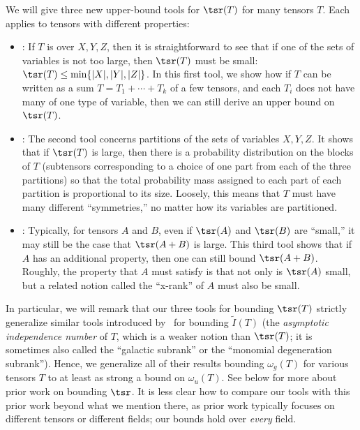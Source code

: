 \documentclass{toc}
\begin{document}
We will give three new 
%
upper-bound tools for  %
$\tsr(T)$ for many tensors $T$. Each applies to tensors with different properties:

\begin{itemize}
    \item {}: If $T$ is over $X,Y,Z$, then it is straightforward to see that if one of the 
    sets of variables
    is not too large, then $\tsr(T)$ must be small: $\tsr(T) \leq \min\{ |X|, |Y|, |Z| \}$. In this first tool, we show how if $T$ can be written as a sum $T = T_1 + \cdots + T_k$ of a few tensors, and each $T_i$ does not have many of one type of variable, then we can still derive an upper bound on $\tsr(T)$. 
    \item {}: The second tool concerns partitions of the  
    sets of variables
    $X,Y,Z$. It shows that if $\tsr(T)$ is large, then there is a probability distribution on the blocks of $T$ (subtensors corresponding to a choice of one part from each of the three partitions) so that the total probability mass assigned to each part of each partition is proportional to its size. Loosely, this means that $T$ must have many different ``symmetries,'' no matter how its variables are partitioned. 
    \item {}: Typically, for tensors $A$ and $B$, even if $\tsr(A)$ and $\tsr(B)$ are ``small,'' it may still be the case that $\tsr(A+B)$ is large. This third tool shows that if $A$ has an additional property, then one can still bound $\tsr(A+B)$. Roughly, the property that $A$ must satisfy is that not only is $\tsr(A)$ small, but a related notion called the ``x-rank'' of $A$ must also be small.
\end{itemize}

In particular, we will remark that our three tools for bounding $\tsr(T)$ strictly generalize similar tools introduced by~\cite{aw} for bounding $\tilde{I}(T)$ (the \emph{asymptotic independence number} of $T$, which is a weaker notion than $\tsr(T)$; it is sometimes also called the ``galactic subrank'' or the ``monomial degeneration subrank''). Hence, we generalize all of their results bounding $\omega_g(T)$ for various tensors $T$ to at least as strong a bound on $\omega_u(T)$. See  below for more about prior work on bounding $\tsr$. It is less clear how to compare our tools with this prior work beyond what we mention there, as prior work typically focuses on different tensors or different fields; our bounds hold over \emph{every} field.
\end{document}
